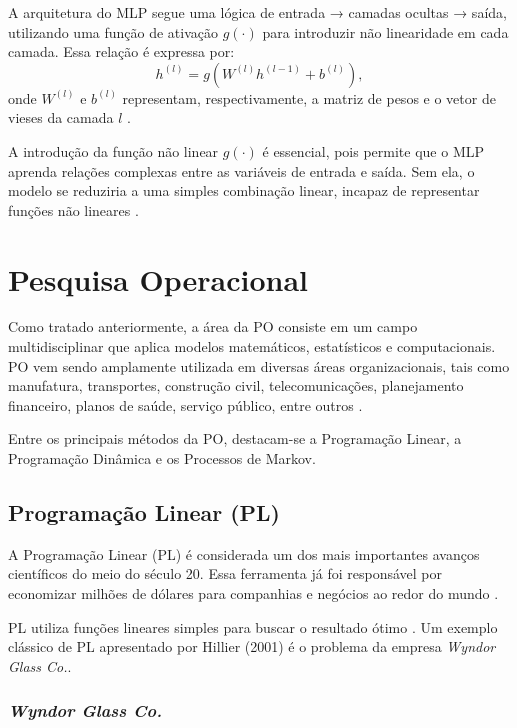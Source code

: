 A arquitetura do MLP segue uma lógica de entrada → camadas ocultas → saída, utilizando uma função de ativação \( g(\cdot) \) para introduzir não linearidade em cada camada. Essa relação é expressa por:
\[
h^{(l)} = g\!\left(W^{(l)}h^{(l-1)} + b^{(l)}\right),
\]
onde \( W^{(l)} \) e \( b^{(l)} \) representam, respectivamente, a matriz de pesos e o vetor de vieses da camada \( l \) \cite{Goodfellow2016}.

A introdução da função não linear \( g(\cdot) \) é essencial, pois permite que o MLP aprenda relações complexas entre as variáveis de entrada e saída. Sem ela, o modelo se reduziria a uma simples combinação linear, incapaz de representar funções não lineares \cite{Goodfellow2016}.


\section{Pesquisa Operacional}

Como tratado anteriormente, a área da PO consiste em um campo multidisciplinar que aplica modelos matemáticos, estatísticos e computacionais. PO vem sendo amplamente utilizada em diversas áreas organizacionais, tais como manufatura, transportes, construção civil, telecomunicações, planejamento financeiro, planos de saúde, serviço público, entre outros \cite{Hillier2001}.

Entre os principais métodos da PO, destacam-se a Programação Linear, a Programação Dinâmica e os Processos de Markov.

\subsection{Programação Linear (PL)}

A Programação Linear (PL) é considerada um dos mais importantes avanços científicos do meio do século 20. Essa ferramenta já foi responsável por economizar milhões de dólares para companhias e negócios ao redor do mundo \cite{Hillier2001}.

PL utiliza funções lineares simples para buscar o resultado ótimo \cite{Hillier2001}. Um exemplo clássico de PL apresentado por Hillier (2001) é o problema da empresa \textit{Wyndor Glass Co.}.

\subsubsection{\textit{Wyndor Glass Co.}}

